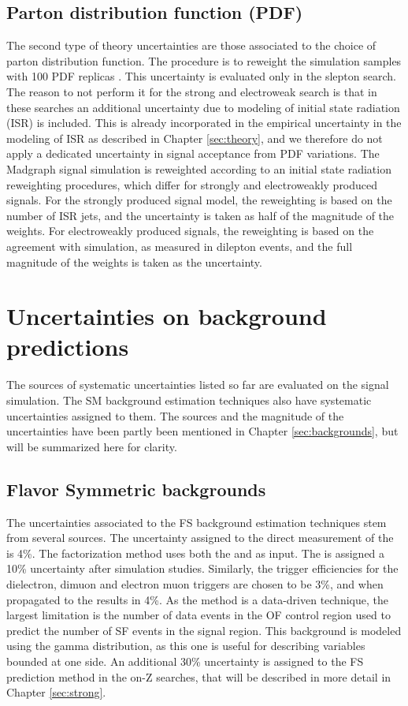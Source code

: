 \subsection*{Parton distribution function (PDF)}
\noindent\justify
The second type of theory uncertainties are those associated to the choice of parton distribution function. 
The procedure is to reweight the simulation samples with 100 PDF replicas \cite{Butterworth:2015oua}. 
This uncertainty is evaluated only in the slepton search. 
The reason to not perform it for the strong and electroweak search is that in these searches an additional uncertainty due to modeling of initial state radiation (ISR) is included. 
This is already incorporated in the empirical uncertainty in the modeling of ISR as described in Chapter \ref{sec:theory}, and we therefore do not apply a dedicated uncertainty in signal acceptance from PDF variations.
The Madgraph signal simulation is reweighted according to an initial state radiation reweighting procedures, which differ for strongly and electroweakly produced signals. 
For the strongly produced signal model, the reweighting is based on the number of ISR jets, and the uncertainty is taken as half of the magnitude of the weights. 
For electroweakly produced signals, the reweighting is based on the \PZ \pt agreement with simulation, as measured in dilepton events, and the full magnitude of the weights is taken as the uncertainty. 
\section{Uncertainties on background predictions}
\noindent\justify
The sources of systematic uncertainties listed so far are evaluated on the signal simulation. 
The SM background estimation techniques also have systematic uncertainties assigned to them. 
The sources and the magnitude of the uncertainties have been partly been mentioned in Chapter \ref{sec:backgrounds}, but will be summarized here for clarity. 
\subsection*{Flavor Symmetric backgrounds}
\noindent\justify
The uncertainties associated to the FS background estimation techniques stem from several sources.
The uncertainty assigned to the direct measurement of the \Rsfof is 4\%. 
The factorization method uses both the \rmue and \RT as input. 
The \rmue is assigned a 10\% uncertainty after simulation studies.  
Similarly, the trigger efficiencies for the dielectron, dimuon and electron muon triggers are chosen to be 3\%, and when propagated to the \RT results in 4\%.   
As the method is a data-driven technique, the largest limitation is the number of data events in the OF control region used to predict the number of SF events in the signal region. 
This background is modeled using the gamma distribution, as this one is useful for describing variables bounded at one side.  
An additional 30\% uncertainty is assigned to the FS prediction method in the on-Z searches, that will be described in more detail in Chapter \ref{sec:strong}. 
